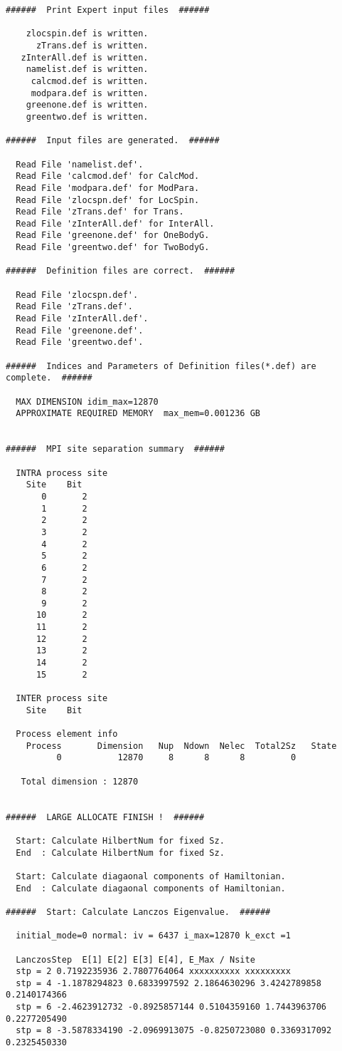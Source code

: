 \begin{verbatim}
######  Print Expert input files  ######

    zlocspin.def is written.
      zTrans.def is written.
   zInterAll.def is written.
    namelist.def is written.
     calcmod.def is written.
     modpara.def is written.
    greenone.def is written.
    greentwo.def is written.

######  Input files are generated.  ######

  Read File 'namelist.def'.
  Read File 'calcmod.def' for CalcMod.
  Read File 'modpara.def' for ModPara.
  Read File 'zlocspn.def' for LocSpin.
  Read File 'zTrans.def' for Trans.
  Read File 'zInterAll.def' for InterAll.
  Read File 'greenone.def' for OneBodyG.
  Read File 'greentwo.def' for TwoBodyG.

######  Definition files are correct.  ######

  Read File 'zlocspn.def'.
  Read File 'zTrans.def'.
  Read File 'zInterAll.def'.
  Read File 'greenone.def'.
  Read File 'greentwo.def'.

######  Indices and Parameters of Definition files(*.def) are complete.  ######

  MAX DIMENSION idim_max=12870 
  APPROXIMATE REQUIRED MEMORY  max_mem=0.001236 GB 


######  MPI site separation summary  ######

  INTRA process site
    Site    Bit
       0       2
       1       2
       2       2
       3       2
       4       2
       5       2
       6       2
       7       2
       8       2
       9       2
      10       2
      11       2
      12       2
      13       2
      14       2
      15       2

  INTER process site
    Site    Bit

  Process element info
    Process       Dimension   Nup  Ndown  Nelec  Total2Sz   State
          0           12870     8      8      8         0   

   Total dimension : 12870


######  LARGE ALLOCATE FINISH !  ######

  Start: Calculate HilbertNum for fixed Sz. 
  End  : Calculate HilbertNum for fixed Sz. 

  Start: Calculate diagaonal components of Hamiltonian. 
  End  : Calculate diagaonal components of Hamiltonian. 

######  Start: Calculate Lanczos Eigenvalue.  ######

  initial_mode=0 normal: iv = 6437 i_max=12870 k_exct =1 

  LanczosStep  E[1] E[2] E[3] E[4], E_Max / Nsite
  stp = 2 0.7192235936 2.7807764064 xxxxxxxxxx xxxxxxxxx 
  stp = 4 -1.1878294823 0.6833997592 2.1864630296 3.4242789858 0.2140174366 
  stp = 6 -2.4623912732 -0.8925857144 0.5104359160 1.7443963706 0.2277205490 
  stp = 8 -3.5878334190 -2.0969913075 -0.8250723080 0.3369317092 0.2325450330 
\end{verbatim}

